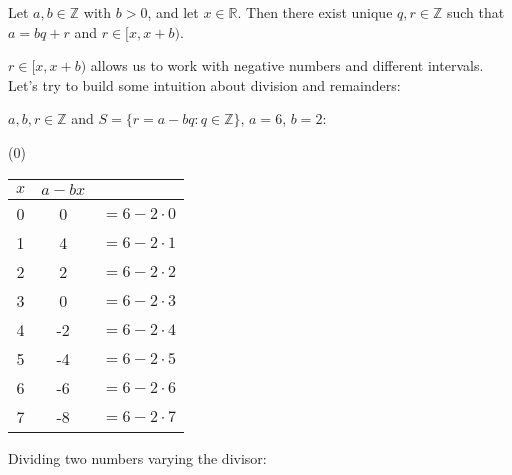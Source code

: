 \newpage

\begin{theo}

    Let $a, b \in \mathbb{Z}$ with $b > 0$, and let $x \in \mathbb{R}$. Then there exist unique $q, r \in \mathbb{Z}$ such that $a = bq + r$ and $r \in [x, x + b)$.
\end{theo}

\noindent
$r \in [x, x + b)$ allows us to work with negative numbers and different intervals. Let's
try to build some intuition about division and remainders:

\begin{center}
    $a,b,r\in\mathbb{Z}$ and $S=\{r=a-bq:q\in\mathbb{Z}\}$, $a=6$, $b=2$:
\end{center}
\begin{center}
    (0)\qquad
    \begin{tabular}{c|cc}
        $x$ & $a-bx$                \\
        \hline
        0   & 0      & $=6-2\cdot0$ \\
        1   & 4      & $=6-2\cdot1$ \\
        2   & 2      & $=6-2\cdot2$ \\
        3   & 0      & $=6-2\cdot3$ \\
        \hline
        4   & -2     & $=6-2\cdot4$ \\
        5   & -4     & $=6-2\cdot5$ \\
        6   & -6     & $=6-2\cdot6$ \\
        7   & -8     & $=6-2\cdot7$ \\
    \end{tabular}
\end{center}

\noindent
Dividing two numbers varying the divisor:


